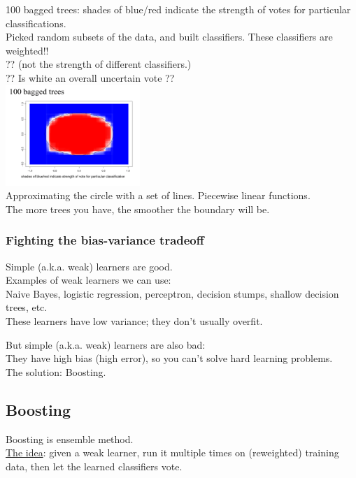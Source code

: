 100 bagged trees:  shades of blue/red indicate the strength of votes for particular classifications. \hfill \\
Picked random subsets of the data, and built classifiers.  These classifiers are weighted!! \hfill \\  %
?? (not the strength of different classifiers.)   \hfill \\ 
?? Is white an overall uncertain vote ??   \hfill \\ 
\includegraphics[width=2in]{figures/100_bagged_trees.pdf} \hfill \\
Approximating the circle with a set of lines.  Piecewise linear functions. \hfill \\ %
The more trees you have, the smoother the boundary will be. 

\subsubsection{Fighting the bias-variance tradeoff}
Simple (a.k.a. weak) learners are good. \hfill \\ 
Examples of weak learners we can use: \hfill \\ 
Naive Bayes, logistic regression, perceptron, decision stumps, shallow decision trees, etc. \hfill \\ 
These learners have low variance; they don't usually overfit. 

But simple (a.k.a. weak) learners are also bad: \hfill \\ 
They have high bias (high error), so you can't solve hard learning problems. \hfill \\ 

The solution: Boosting. 

\subsection{Boosting}
Boosting is ensemble method. \hfill \\
\underline{The idea}: given a weak learner, run it multiple times on (reweighted) training data, 
	then let the learned classifiers vote.  \hfill \\
	
